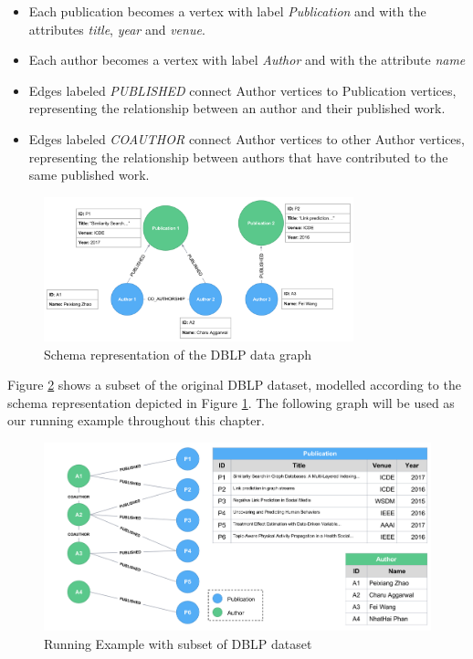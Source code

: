 \begin{itemize}
\item Each publication becomes a vertex with label \emph{Publication} and with the attributes \emph{title}, \emph{year} and \emph{venue}.
\item Each author becomes a vertex with label \emph{Author} and with the attribute \emph{name}
\item Edges labeled \emph{PUBLISHED} connect Author vertices to Publication vertices, representing the relationship between an author and their published work.
\item Edges labeled \emph{COAUTHOR} connect Author vertices to other Author vertices, representing the relationship between authors that have contributed to the same published work.
\end{itemize}

\begin{figure}[ht]
\centering
\includegraphics[width=0.8\textwidth]{../dblp_schema_with_attr.png}
\caption{Schema representation of the DBLP data graph}
\label{fig:figure25}
\end{figure}

Figure \ref{fig:figure26} shows a subset of the original DBLP dataset, modelled according to the schema representation depicted in Figure \ref{fig:figure25}. The following graph will be used as our running example throughout this chapter.

\begin{figure}[ht]
\centering
\includegraphics[width=1\textwidth]{../running_example.png}
\caption{Running Example with subset of DBLP dataset}
\label{fig:figure26}
\end{figure}

